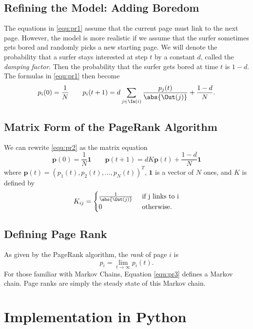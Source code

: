 \subsection*{Refining the Model: Adding Boredom}
The equations in \eqref{equ:pr1} assume that the current page must link to the next page.
However, the model is more realistic if we assume that the surfer sometimes gets bored and randomly picks a new starting page.
We will denote the probability that a surfer stays interested at step $t$ by a constant $d$, called the \emph{damping factor}.
Then the probability that the surfer gets bored at time $t$ is $1-d$.
The formulas in \eqref{equ:pr1} then become
\begin{equation}\label{equ:pr2}
p_i(0)=\frac{1}{N} \qquad p_i(t+1) = d\sum_{j \in \In(i)} \frac{p_j(t)}{\abs{\Out(j)}}+\frac{1-d}{N} .
\end{equation}

\subsection*{Matrix Form of the PageRank Algorithm}
We can rewrite \eqref{equ:pr2} as the matrix equation
\begin{equation}\label{equ:pr3}
\mathbf{p}(0)=\frac{1}{N}\mathbf{1} \qquad \mathbf{p}(t+1) = dK\mathbf{p}(t) + \frac{1-d}{N}\mathbf{1}
\end{equation}
where $\mathbf{p}(t)=(p_1(t), p_2(t), \ldots, p_N(t))^T$,
$\mathbf{1}$ is a vector of $N$ ones,
and $K$ is defined by
\[K_{ij} = \begin{cases} \frac{1}{\abs{\Out(j)}} & \mbox{ if j links to i} \\
	0 & \mbox{ otherwise.} \end{cases}\]


\subsection*{Defining Page Rank}
As given by the PageRank algorithm, the \emph{rank} of page $i$ is
\[p_i = \lim_{t\to \infty} p_i(t).\]
For those familiar with Markov Chains, Equation \ref{equ:pr3} defines a Markov chain. Page ranks are simply the steady state of this Markov chain.


\section*{Implementation in Python}


